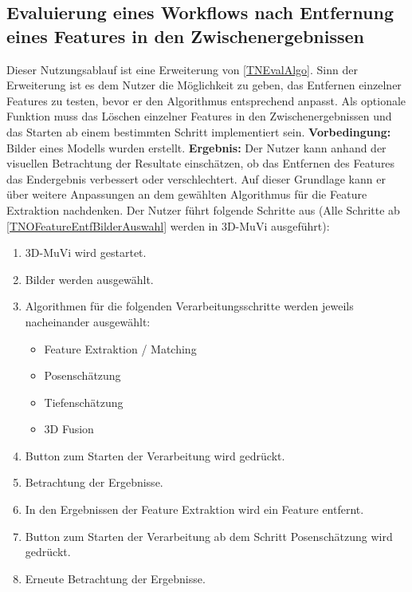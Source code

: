 \subsection{Evaluierung eines Workflows nach Entfernung eines Features in den Zwischenergebnissen}
Dieser Nutzungsablauf ist eine Erweiterung von \ref{TNEvalAlgo}. Sinn der Erweiterung ist es dem Nutzer die Möglichkeit zu geben, das Entfernen einzelner Features zu testen, bevor er den Algorithmus entsprechend anpasst. Als optionale Funktion muss das Löschen einzelner Features in den Zwischenergebnissen und das Starten ab einem bestimmten Schritt implementiert sein. \newline
\textbf{Vorbedingung:} Bilder eines Modells wurden erstellt. \newline
\textbf{Ergebnis:} Der Nutzer kann anhand der visuellen Betrachtung der Resultate einschätzen, ob das Entfernen des Features das Endergebnis verbessert oder verschlechtert. Auf dieser Grundlage kann er über weitere Anpassungen an dem gewählten Algorithmus für die Feature Extraktion nachdenken. \newline
Der Nutzer führt folgende Schritte aus (Alle Schritte ab \ref{TNOFeatureEntfBilderAuswahl} werden in 3D-MuVi ausgeführt):
\begin{enumerate}
	\item 3D-MuVi wird gestartet.
	\item \label{TNOFeatureEntfBilderAuswahl} Bilder werden ausgewählt.
	\item Algorithmen für die folgenden Verarbeitungsschritte werden jeweils nacheinander ausgewählt:
	\begin{itemize}
		\item Feature Extraktion / Matching
		\item Posenschätzung
		\item Tiefenschätzung
		\item 3D Fusion
	\end{itemize}
	\item Button zum Starten der Verarbeitung wird gedrückt.
	\item Betrachtung der Ergebnisse.
	\item In den Ergebnissen der Feature Extraktion wird ein Feature entfernt.
	\item Button zum Starten der Verarbeitung ab dem Schritt Posenschätzung wird gedrückt.
	\item Erneute Betrachtung der Ergebnisse.
\end{enumerate}

